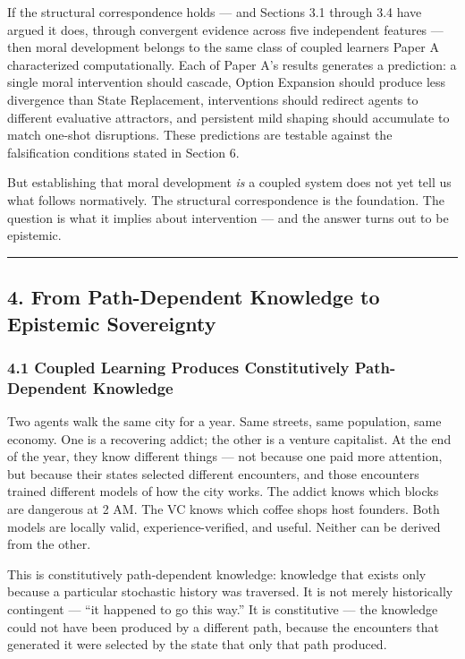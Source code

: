 \documentclass[
]{article}
\begin{document}
If the structural correspondence holds --- and Sections 3.1 through 3.4
have argued it does, through convergent evidence across five independent
features --- then moral development belongs to the same class of coupled
learners Paper A characterized computationally. Each of Paper A's
results generates a prediction: a single moral intervention should
cascade, Option Expansion should produce less divergence than State
Replacement, interventions should redirect agents to different
evaluative attractors, and persistent mild shaping should accumulate to
match one-shot disruptions. These predictions are testable against the
falsification conditions stated in Section 6.

But establishing that moral development \emph{is} a coupled system does
not yet tell us what follows normatively. The structural correspondence
is the foundation. The question is what it implies about intervention
--- and the answer turns out to be epistemic.

\begin{center}\rule{0.5\linewidth}{0.5pt}\end{center}

\subsection{4. From Path-Dependent Knowledge to Epistemic
Sovereignty}\label{from-path-dependent-knowledge-to-epistemic-sovereignty}

\subsubsection{4.1 Coupled Learning Produces Constitutively
Path-Dependent
Knowledge}\label{coupled-learning-produces-constitutively-path-dependent-knowledge}

Two agents walk the same city for a year. Same streets, same population,
same economy. One is a recovering addict; the other is a venture
capitalist. At the end of the year, they know different things --- not
because one paid more attention, but because their states selected
different encounters, and those encounters trained different models of
how the city works. The addict knows which blocks are dangerous at 2 AM.
The VC knows which coffee shops host founders. Both models are locally
valid, experience-verified, and useful. Neither can be derived from the
other.

This is constitutively path-dependent knowledge: knowledge that exists
only because a particular stochastic history was traversed. It is not
merely historically contingent --- ``it happened to go this way.'' It is
constitutive --- the knowledge could not have been produced by a
different path, because the encounters that generated it were selected
by the state that only that path produced.
\end{document}
